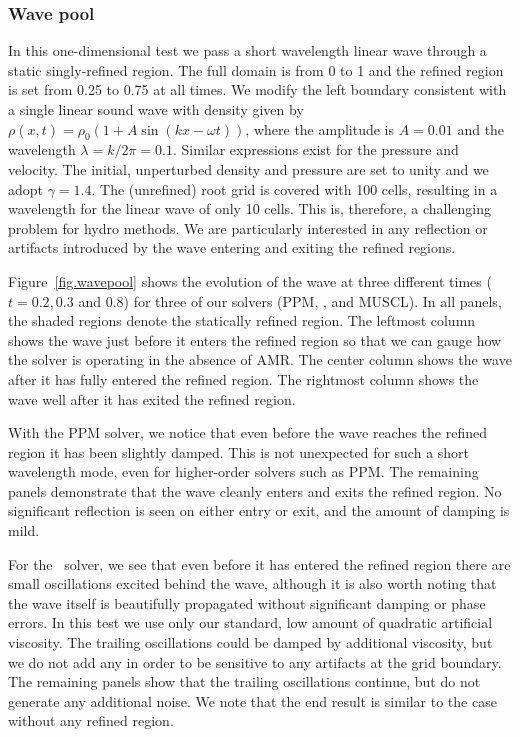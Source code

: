 \subsubsection{Wave pool}
\label{sec.tests.wavepool}

In this one-dimensional test we pass a short wavelength linear wave
through a static singly-refined region.  The full domain is from 0 to
1 and the refined region is set from 0.25 to 0.75 at all times.  We
modify the left boundary consistent with a single linear sound wave
with density given by $\rho(x,t) = \rho_0 (1 + A \sin(kx - \omega
t))$, where the amplitude is $A = 0.01$ and the wavelength $\lambda =
k/2\pi = 0.1$.  Similar expressions exist for the pressure and
velocity.  The initial, unperturbed density and pressure are set to
unity and we adopt $\gamma = 1.4$.  The (unrefined) root grid is
covered with 100 cells, resulting in a wavelength for the linear wave
of only 10 cells.  This is, therefore, a challenging problem for hydro
methods.  We are particularly interested in any reflection or
artifacts introduced by the wave entering and exiting the refined
regions.

Figure~\ref{fig.wavepool} shows the evolution of the wave at three
different times ($t = 0.2, 0.3$ and 0.8) for three of our solvers
(PPM, \zeus, and MUSCL).  In all panels, the shaded regions denote the
statically refined region. The leftmost column shows the wave just
before it enters the refined region so that we can gauge how the
solver is operating in the absence of AMR.  The center column shows
the wave after it has fully entered the refined region.  The rightmost
column shows the wave well after it has exited the refined region.

With the PPM solver, we notice that even before the wave reaches the
refined region it has been slightly damped. This is not unexpected for
such a short wavelength mode, even for higher-order solvers such as
PPM.  The remaining panels demonstrate that the wave cleanly enters
and exits the refined region.  No significant reflection is seen on
either entry or exit, and the amount of damping is mild.

For the \zeus\ solver, we see that even before it has entered the
refined region there are small oscillations excited behind the wave,
although it is also worth noting that the wave itself is beautifully
propagated without significant damping or phase errors.  In this test
we use only our standard, low amount of quadratic artificial
viscosity.  The trailing oscillations could be damped by additional
viscosity, but we do not add any in order to be sensitive to any
artifacts at the grid boundary.  The remaining panels show that the
trailing oscillations continue, but do not generate any additional
noise. We note that the end result is similar to the case without any
refined region.

